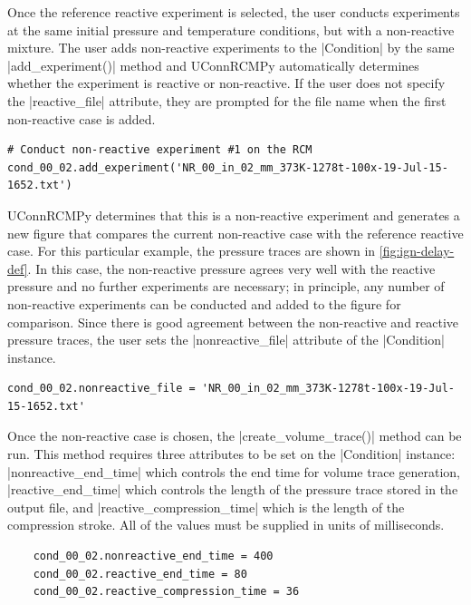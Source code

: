 \documentclass[12pt]{../ussci}
\begin{document}
Once the reference reactive experiment is selected, the user conducts
experiments at the same initial pressure and temperature conditions, but with a
non-reactive mixture. The user adds non-reactive experiments to the
\python|Condition| by the same \python|add_experiment()| method and UConnRCMPy
automatically determines whether the experiment is reactive or non-reactive. If
the user does not specify the \python|reactive_file| attribute, they are
prompted for the file name when the first non-reactive case is added.

\begin{verbatim}
# Conduct non-reactive experiment #1 on the RCM
cond_00_02.add_experiment('NR_00_in_02_mm_373K-1278t-100x-19-Jul-15-1652.txt')
\end{verbatim}

UConnRCMPy determines that this is a non-reactive experiment and
generates a new figure that compares the current non-reactive case with
the reference reactive case. For this particular example, the pressure traces
are shown in \cref{fig:ign-delay-def}. In this case, the non-reactive
pressure agrees very well with the reactive pressure and no further
experiments are necessary; in principle, any number of non-reactive
experiments can be conducted and added to the figure for comparison.
Since there is good agreement between the non-reactive and reactive
pressure traces, the user sets the \python|nonreactive_file| attribute of the
\python|Condition| instance.

\begin{verbatim}
cond_00_02.nonreactive_file = 'NR_00_in_02_mm_373K-1278t-100x-19-Jul-15-1652.txt'
\end{verbatim}

Once the non-reactive case is chosen, the \python|create_volume_trace()| method
can be run. This method requires three attributes to be set on the
\python|Condition| instance: \python|nonreactive_end_time| which controls the
end time for volume trace generation, \python|reactive_end_time| which controls
the length of the pressure trace stored in the output file, and
\python|reactive_compression_time| which is the length of the compression
stroke. All of the values must be supplied in units of milliseconds.

\begin{verbatim}
    cond_00_02.nonreactive_end_time = 400
    cond_00_02.reactive_end_time = 80
    cond_00_02.reactive_compression_time = 36
\end{verbatim}
\end{document}
